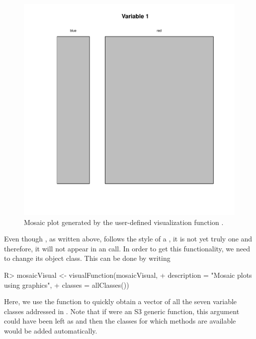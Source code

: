 \documentclass[article,shortnames]{jss}
\newcommand{\hl}[1]{\textcolor{magenta}{#1}}
\begin{document}
\begin{figure}
\begin{center}
\includegraphics[scale=0.2]{mosaicPlotExample.pdf}
\end{center}

\caption{Mosaic plot generated by the user-defined visualization
  function .}
\label{fig:mosaicPlot}
\end{figure}




Even though , as written above, follows the style of a
, it is not yet truly one and therefore, it will not
appear in an  call. In order to get this
functionality, we need to change its object class. This can be done by
writing

\begin{Schunk}
\begin{Sinput}
R> mosaicVisual <- visualFunction(mosaicVisual,
+    description = "Mosaic plots using graphics",
+    classes = allClasses())
\end{Sinput}
\end{Schunk}

Here, we use the function  to quickly obtain a vector
of all the seven variable classes addressed in . Note that
if  were an S3 generic function, this argument could
have been left as  and then the classes for which methods are
available would be added automatically.
\end{document}
